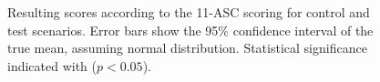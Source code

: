 \begin{figure}[H]
    \centering
    \caption{
        Resulting scores according to the \ac{11-ASC} scoring for control and test scenarios.
        Error bars show the 95\% confidence interval of the true mean, assuming normal distribution.
        Statistical significance indicated with \raisebox{-0.7ex}{*} ($p < 0.05$).
    }
    \label{fig:results-11-asc}
\end{figure}
